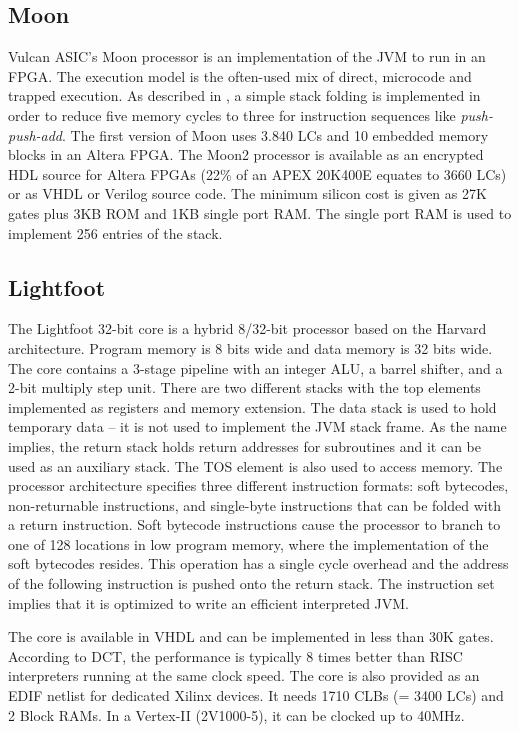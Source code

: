 \subsection{Moon}

Vulcan ASIC's Moon processor is an implementation of the JVM to run
in an FPGA. The execution model is the often-used mix of direct,
microcode and trapped execution. As described in \cite{Vulcan2000},
a simple stack folding is implemented in order to reduce five memory
cycles to three for instruction sequences like
\textit{push-push-add}. The first version of Moon uses 3.840 LCs and
10 embedded memory blocks in an Altera FPGA. The Moon2 processor
\cite{Vulcan2003} is available as an encrypted HDL source for Altera
FPGAs (22\% of an APEX 20K400E equates to 3660 LCs) or as VHDL or
Verilog source code. The minimum silicon cost is given as 27K gates
plus 3KB ROM and 1KB single port RAM. The single port RAM is used to
implement 256 entries of the stack.


\subsection{Lightfoot}

The Lightfoot 32-bit core \cite{Lightfoot} is a hybrid 8/32-bit
processor based on the Harvard architecture. Program memory is 8 bits
wide and data memory is 32 bits wide. The core contains a 3-stage
pipeline with an integer ALU, a barrel shifter, and a 2-bit multiply
step unit. There are two different stacks with the top elements
implemented as registers and memory extension. The data stack is used
to hold temporary data -- it is not used to implement the JVM stack
frame. As the name implies, the return stack holds return addresses
for subroutines and it can be used as an auxiliary stack. The TOS
element is also used to access memory. The processor architecture
specifies three different instruction formats: soft bytecodes,
non-returnable instructions, and single-byte instructions that can be
folded with a return instruction. Soft bytecode instructions cause
the processor to branch to one of 128 locations in low program
memory, where the implementation of the soft bytecodes resides. This
operation has a single cycle overhead and the address of the
following instruction is pushed onto the return stack. The
instruction set implies that it is optimized to write an efficient
interpreted JVM.


The core is available in VHDL and can be implemented in less than
30K gates. According to DCT, the performance is typically 8 times
better than RISC interpreters running at the same clock speed. The
core is also provided as an EDIF netlist for dedicated Xilinx
devices. It needs 1710 CLBs (= 3400 LCs) and 2 Block RAMs. In a
Vertex-II (2V1000-5), it can be clocked up to 40MHz.


